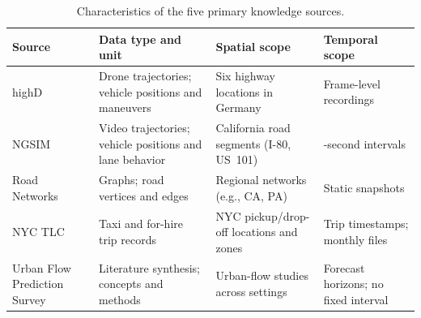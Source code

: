 \documentclass[a4paper,fleqn]{cas-sc}
\begin{document}
\begin{table}[H]
\centering
\small
\setlength{\tabcolsep}{4pt}
\renewcommand{\arraystretch}{1.2}
\caption{Characteristics of the five primary knowledge sources.}
\label{tab:source_characteristics}
\begin{tabular}{@{}>{\raggedright\arraybackslash}p{2.35cm}>{\raggedright\arraybackslash}p{3.55cm}>{\raggedright\arraybackslash}p{3.65cm}>{\raggedright\arraybackslash}p{3.5cm}@{}}
\toprule
\textbf{Source} & \textbf{Data type and unit} & \textbf{Spatial scope} & \textbf{Temporal scope} \\
\midrule
highD~\cite{highd2024dataset} & Drone trajectories; vehicle positions and maneuvers & Six highway locations in Germany & Frame-level recordings \\
NGSIM~\cite{ngsim2024dataset} & Video trajectories; vehicle positions and lane behavior & California road segments (I-80, US~101) & 0.1-second intervals \\
Road Networks~\cite{networkrepository2024road} & Graphs; road vertices and edges & Regional networks (e.g., CA, PA) & Static snapshots \\
NYC TLC~\cite{nyc2024tlc} & Taxi and for-hire trip records & NYC pickup/drop-off locations and zones & Trip timestamps; monthly files \\
Urban Flow Prediction Survey~\cite{xie2020urbanflow} & Literature synthesis; concepts and methods & Urban-flow studies across settings & Forecast horizons; no fixed interval \\
\bottomrule
\end{tabular}
\end{table}



\end{document}
